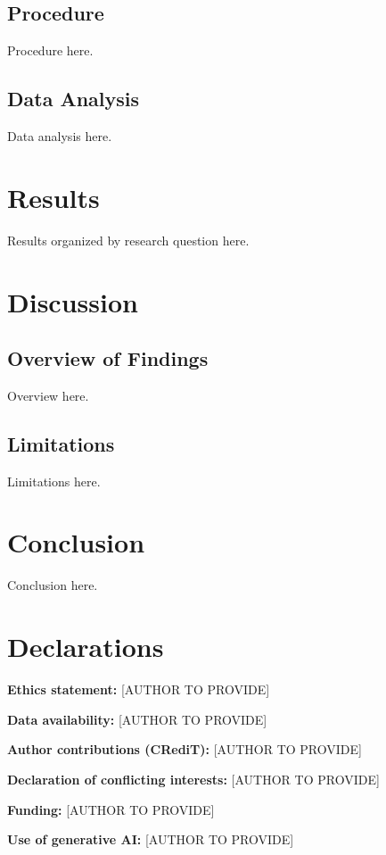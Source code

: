 \documentclass[Afour,times]{sagej}
\begin{document}
\subsection{Procedure}
Procedure here.

\subsection{Data Analysis}
Data analysis here.

\section{Results}
\label{sec:results}
Results organized by research question here.

\section{Discussion}
\label{sec:discussion}
\subsection{Overview of Findings}
Overview here.

\subsection{Limitations}
Limitations here.

\section{Conclusion}
\label{sec:conclusion}
Conclusion here.

\section*{Declarations}
\textbf{Ethics statement:} [AUTHOR TO PROVIDE]

\textbf{Data availability:} [AUTHOR TO PROVIDE]

\textbf{Author contributions (CRediT):} [AUTHOR TO PROVIDE]

\textbf{Declaration of conflicting interests:} [AUTHOR TO PROVIDE]

\textbf{Funding:} [AUTHOR TO PROVIDE]

\textbf{Use of generative AI:} [AUTHOR TO PROVIDE]

\printbibliography[title=References]
\end{document}
